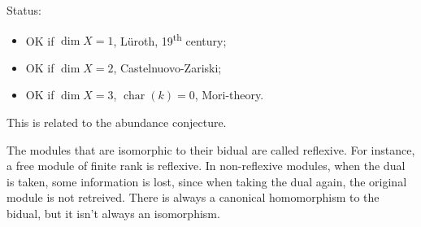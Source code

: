 \documentclass[12pt]{article}
\DeclareMathOperator{\chara}{char}
\theoremstyle{definition}
\begin{document}
Status:
\begin{itemize}[label=$-$]
\item OK if $\dim X=1$, L\"{u}roth, 19\textsuperscript{th} century;
\item OK if $\dim X=2$, Castelnuovo-Zariski;
\item OK if $\dim X=3$, $\chara(k)=0$, Mori-theory.
\end{itemize}

This is related to the abundance conjecture.

The modules that are isomorphic to their bidual are called reflexive. For instance, a free module of finite rank is reflexive. In non-reflexive modules, when the dual is taken, some information is lost, since when taking the dual again, the original module is not retreived. There is always a canonical homomorphism to the bidual, but it isn't always an isomorphism.
\end{document}
